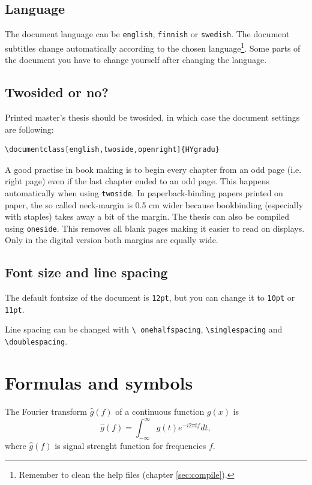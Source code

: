 \documentclass[english,twoside,openright]{HYgradu}
\begin{document}
\section{Language}

The document language can be \texttt{english}, \texttt{finnish} or
\texttt{swedish}. The document subtitles change automatically
according to the chosen language\footnote{Remember to clean the help
  files (chapter \ref{sec:compile}).}. Some parts of the document you
have to change yourself after changing the language.
 
\section{Twosided or no?}
 
Printed master's thesis should be twosided, in which case the document
settings are following:
\begin{verbatim}
\documentclass[english,twoside,openright]{HYgradu}
\end{verbatim}
A good practise in book making is to begin every chapter from an odd
page (i.e. right page) even if the last chapter ended to an odd
page. This happens automatically when using \texttt{twoside}. In
paperback-binding papers printed on paper, the so called neck-margin
is 0.5 cm wider because bookbinding (especially with staples) takes
away a bit of the margin.  The thesis can also be compiled using
\texttt{oneside}. This removes all blank pages making it easier to
read on displays. Only in the digital version both margins are equally
wide.

\section{Font size and line spacing}

The default fontsize of the document is \texttt{12pt}, but you can
change it to \texttt{10pt} or \texttt{11pt}.

Line spacing can be changed with \texttt{\textbackslash
  onehalfspacing}, \texttt{\textbackslash singlespacing} and
\texttt{\textbackslash doublespacing}.


\chapter{Formulas and symbols}

The Fourier transform $\hat{g} (f)$ of a continuous function $g(x)$ is
\begin{equation}
\label{eq: Fourier}
\hat{g}(f) = \int_{-\infty}^{\infty}g(t)e^{-i 2 \pi t f} dt,
\end{equation}
where $\hat{g}(f)$ is signal strenght function for frequencies $f$.
\end{document}

